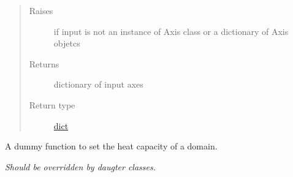 \documentclass[a4paper,10pt,english]{sphinxmanual}
\begin{document}
\begin{fulllineitems}
\begin{fulllineitems}
\begin{quote}
\begin{description}
\item[{Raises}] \leavevmode
{}  if input is not an instance of Axis class 
or a dictionary of Axis objetcs

\item[{Returns}] \leavevmode
dictionary of input axes

\item[{Return type}] \leavevmode
\href{http://docs.python.org/2.7/library/stdtypes.html\#dict}{dict}

\end{description}\end{quote}

\end{fulllineitems}


\begin{fulllineitems}
\label{api/climlab.domain:climlab.domain.domain._Domain.set_heat_capacity}
A dummy function to set the heat capacity of a domain.

\emph{Should be overridden by daugter classes.}

\end{fulllineitems}


\end{fulllineitems}

\end{document}
